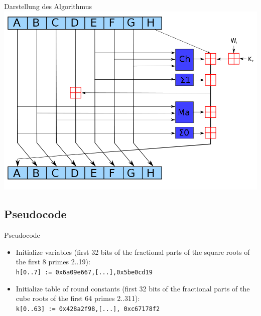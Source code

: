 \documentclass[xcolor=x11names,compress]{beamer}
\renewcommand{\(}{\begin{columns}}
\renewcommand{\)}{\end{columns}}
\newcommand{\<}[1]{\begin{column}{#1}}
\renewcommand{\>}{\end{column}}
\begin{document}
\begin{frame}{Darstellung des Algorithmus}
\includegraphics[scale=0.3]{sha256.png}\\
\end{frame}


\subsection{Pseudocode}
\begin{frame}{Pseudocode}
\begin{itemize}
\item Initialize variables
(first 32 bits of the fractional parts of the square roots of the first 8 primes 2..19):\\
\texttt{h[0..7] := 0x6a09e667,[...],0x5be0cd19}
\pause
\item Initialize table of round constants
(first 32 bits of the fractional parts of the cube roots of the first 64 primes 2..311):\\
\texttt{k[0..63] := 0x428a2f98,[...], 0xc67178f2}
\end{itemize}



\end{frame}
\end{document}
